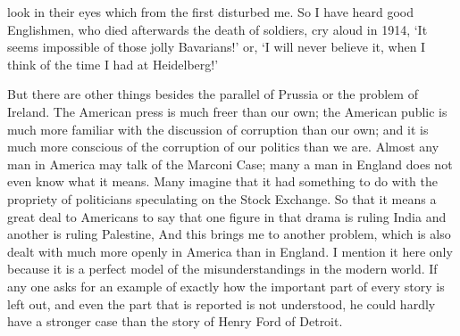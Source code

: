 \documentclass{book}
\begin{document}
look in their eyes which from the first disturbed me. So I have heard good Englishmen, who died afterwards the death of soldiers, cry aloud in 1914, ‘It seems impossible of those jolly Bavarians!’ or, ‘I will never believe it, when I think of the time I had at Heidelberg!’

But there are other things besides the parallel of Prussia or the problem of Ireland. The American press is much freer than our own; the American public is much more familiar with the discussion of corruption than our own; and it is much more conscious of the corruption of our politics than we are. Almost any man in America may talk of the Marconi Case; many a man in England does not even know what it means. Many imagine that it had something to do with the propriety of politicians speculating on the Stock Exchange. So that it means a great deal to Americans to say that one figure in that drama is ruling India and another is ruling Palestine, And this brings me to another problem, which is also dealt with much more openly in America than in England. I mention it here only because it is a perfect model of the misunderstandings in the modern world. If any one asks for an example of exactly how the important part of every story is left out, and even the part that is reported is not understood, he could hardly have a stronger case than the story of Henry Ford of Detroit.
\end{document}
